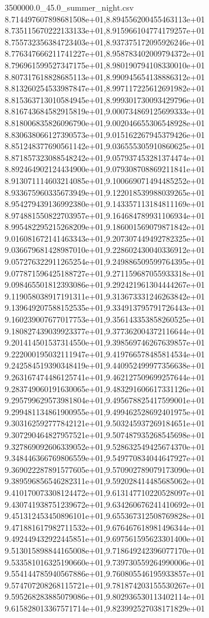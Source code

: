 \begin{filecontents*}{3500000.0_45.0_summer_night.csv}
8.714497607898681508e+01,8.894556200455463113e+01
8.735115670222133133e+01,8.915966104774179257e+01
8.755732356384723403e+01,8.937375172095926246e+01
8.776347666211741227e+01,8.958783402009794372e+01
8.796961599527347175e+01,8.980190794108330010e+01
8.807317618828685113e+01,8.990945654138886312e+01
8.813260254533987847e+01,8.997117225612691982e+01
8.815363713010584945e+01,8.999301730093429796e+01
8.816743684582915819e+01,9.000734869125699333e+01
8.818006835826096790e+01,9.002046655306548928e+01
8.830638066127390573e+01,9.015162267945379426e+01
8.851248377690561142e+01,9.036555305910860625e+01
8.871857323088548242e+01,9.057937453281374474e+01
8.892464902124434900e+01,9.079308708869211841e+01
8.913071114603214085e+01,9.100669071494485252e+01
8.933675960335673949e+01,9.122018539988039265e+01
8.954279439136992380e+01,9.143357113184811169e+01
8.974881550822703957e+01,9.164684789931106934e+01
8.995482295215268209e+01,9.186001569079871842e+01
9.016081672141463343e+01,9.207307449492782325e+01
9.036679681428987010e+01,9.228602430040336912e+01
9.057276322911265254e+01,9.249886509599764395e+01
9.077871596425188727e+01,9.271159687055933318e+01
9.098465501812393086e+01,9.292421961304444267e+01
9.119058038917191311e+01,9.313673331246263842e+01
9.139649207588152535e+01,9.334913795791726443e+01
9.160239007677017753e+01,9.356143353858260525e+01
9.180827439039923377e+01,9.377362004372116644e+01
9.201414501537314550e+01,9.398569746267639857e+01
9.222000195032111947e+01,9.419766578485814534e+01
9.242584519390348419e+01,9.440952499977356638e+01
9.263167474486125741e+01,9.462127509699257644e+01
9.283749060191630065e+01,9.483291606617331126e+01
9.295799629573981804e+01,9.495678825417599001e+01
9.299481134861900955e+01,9.499462528692401975e+01
9.303162592777842121e+01,9.503245937269184651e+01
9.307290464827957521e+01,9.507487935268545698e+01
9.327869092606339052e+01,9.528632549425674370e+01
9.348446366769806559e+01,9.549770834044647927e+01
9.369022287891577605e+01,9.570902789079173090e+01
9.389596856546282311e+01,9.592028414485685062e+01
9.410170073308124472e+01,9.613147710220528097e+01
9.430741938751239672e+01,9.634260676241410692e+01
9.451312453450896101e+01,9.655367312508769828e+01
9.471881617982711532e+01,9.676467618981496344e+01
9.492449432922445851e+01,9.697561595623301400e+01
9.513015898844165008e+01,9.718649242396077170e+01
9.533581016325190660e+01,9.739730559264990006e+01
9.554144785940567886e+01,9.760805546195933857e+01
9.574707208268115721e+01,9.781874203155530267e+01
9.595268283885079086e+01,9.802936530113402114e+01
9.615828013367571714e+01,9.823992527038171829e+01

\end{filecontents*}
